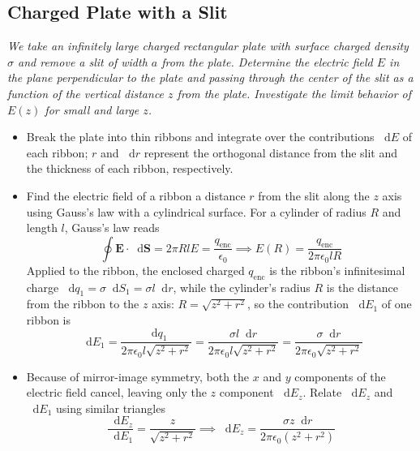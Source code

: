 \documentclass[11pt, a4paper]{article}
\newcommand{\diff}{\mathop{}\!\mathrm{d}} %
\renewcommand{\vec}[1]{\bm{#1}} %
\newcommand{\ee}{\epsilon_{0}}  %
\begin{document}
\subsection{Charged Plate with a Slit}
\textit{We take an infinitely large charged rectangular plate with surface charged density $ \sigma $ and remove a slit of width $ a $ from the plate. Determine the electric field $ E $ in the plane perpendicular to the plate and passing through the center of the slit as a function of the vertical distance $ z $ from the plate. Investigate the limit behavior of $ E(z) $ for small and large $ z $.}
\begin{itemize}
	\item Break the plate into thin ribbons and integrate over the contributions $ \diff E $ of each ribbon; $ r $ and $ \diff r $ represent the orthogonal distance from the slit and the thickness of each ribbon, respectively.
	
	\item Find the electric field of a ribbon a distance $ r $ from the slit along the $ z $ axis using Gauss's law with a cylindrical surface. For a cylinder of radius $ R $ and length $ l $, Gauss's law reads
	\begin{equation*}
		\oint \vec{E} \cdot \diff \vec{S} = 2\pi R l E = \frac{q_{\text{enc}}}{\ee} \implies E(R) = \frac{q_{\text{enc}}}{2\pi \ee l R}
	\end{equation*}
	Applied to the ribbon, the enclosed charged $ q_{\text{enc}} $ is the ribbon's infinitesimal charge $ \diff q_{1} = \sigma \diff S_{1} = \sigma l \diff r $, while the cylinder's radius $ R $ is the distance from the ribbon to the $ z $ axis: $ R = \sqrt{z^{2} + r^{2}} $, so the contribution $ \diff E_{1} $ of one ribbon is
	\begin{equation*}
		\diff E_{1} = \frac{\diff q_{1}}{2\pi \ee l \sqrt{z^{2} + r^{2}}} = \frac{\sigma l \diff r}{2\pi \ee l\sqrt{z^{2} + r^{2}} } = \frac{\sigma \diff r}{2\pi \ee \sqrt{z^{2} + r^{2}} }
	\end{equation*}
	
	\item Because of mirror-image symmetry, both the $ x $ and $ y $ components of the electric field cancel, leaving only the $ z $ component $ \diff E_{z} $. Relate $ \diff E_{z} $ and $ \diff E_{1} $ using similar triangles
	\begin{equation*}
		\frac{\diff E_{z}}{\diff E_{1}} = \frac{z}{\sqrt{z^{2} + r^{2}}} \implies  \diff E_{z} = \frac{\sigma z \diff r}{2\pi \ee (z^{2} + r^{2})}
	\end{equation*}
	

\end{itemize}
\end{document}
